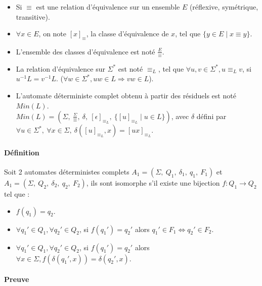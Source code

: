 \begin{itemize}
	\item Si $\equiv$ est une relation d'équivalence sur un ensemble $E$ (réflexive, symétrique, transitive).
	\item $\forall x \in E$, on note $[x]_{\equiv}$, la classe d'équivalence de $x$, tel que $\{ y \in E \mid x \equiv y\}$.
	\item L'ensemble des classes d'équivalence est noté $\frac{E}{\equiv}$.
	\item La relation d'équivalence sur $\Sigma^*$ est noté $\equiv_L$, tel que $\forall u,v \in \Sigma^*, u \equiv_{L} v$, si $u^{-1}L = v^{-1}L$. ($\forall w \in \Sigma^*, uw \in L \Rightarrow vw \in L$).
	\item L'automate déterministe complet obtenu à partir des résiduels est noté $Min(L)$.\\
	$Min(L) = (\Sigma ,\ \frac{\Sigma}{\equiv} ,\ \delta ,\ [\epsilon]_{\equiv_{L}} ,\ \{[u]_{\equiv_{L}} \mid u \in L\} )$, avec $\delta$ défini par $\forall u \in \Sigma^*,\ \forall x \in \Sigma,\ \delta([u]_{\equiv_{L}},x) = [ux]_{\equiv_{L}}$.
\end{itemize}



\paragraph{Définition} %
\label{par:d_finition}

Soit 2 automates déterministes complets $A_1=(\Sigma,\ Q_1,\ \delta_1 ,\ q_1,\ F_1)$ et $A_1=(\Sigma,\ Q_2,\ \delta_2 ,\ q_2,\ F_2)$, ils sont isomorphe s'il existe une bijection $f : Q_1 \rightarrow Q_2$ tel que :

\begin{itemize}
	\item $f(q_1)=q_2$.
	\item $\forall q_1' \in Q_1, \forall q_2' \in Q_2$, si $f(q_1')=q_2'$ alors $q_1' \in F_1 \Leftrightarrow q_2' \in F_2$.
	\item $\forall q_1' \in Q_1, \forall q_2' \in Q_2$, si $f(q_1')=q_2'$ alors $\forall x \in \Sigma, f(\delta(q_1',x))=\delta(q_2',x)$.
\end{itemize}



\paragraph{Preuve} %
\label{par:preuve}

